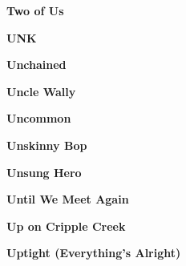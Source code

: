 \newline
\vspace{10pt} 
\begin{center}\textbf{Two of Us}\end{center}
\newline
\vspace{10pt} 
\begin{center}\textbf{UNK}\end{center}
\newline
\vspace{10pt} 
\begin{center}\textbf{Unchained}\end{center}
\newline
\vspace{10pt} 
\begin{center}\textbf{Uncle Wally}\end{center}
\newline
\vspace{10pt} 
\begin{center}\textbf{Uncommon}\end{center}
\newline
\vspace{10pt} 
\begin{center}\textbf{Unskinny Bop}\end{center}
\newline
\vspace{10pt} 
\begin{center}\textbf{Unsung Hero}\end{center}
\newline
\vspace{10pt} 
\begin{center}\textbf{Until We Meet Again}\end{center}
\newline
\vspace{10pt} 
\begin{center}\textbf{Up on Cripple Creek}\end{center}
\newline
\vspace{10pt} 
\begin{center}\textbf{Uptight (Everything's Alright)}\end{center}
